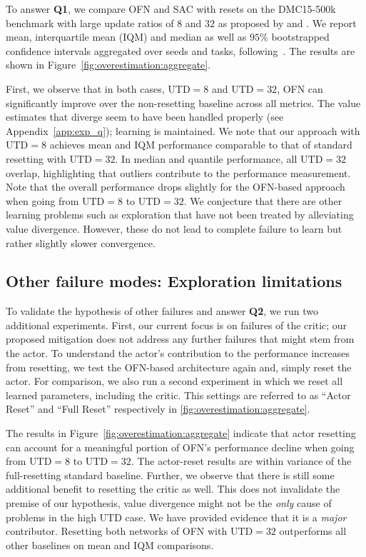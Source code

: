 To answer \textbf{Q1}, we compare OFN and SAC with resets on the DMC15-500k benchmark with large update ratios of $8$ and $32$ as proposed by \textcite{nikishin2022primacy} and  \textcite{schwarzer2023bigger}.  We report mean, interquartile mean (IQM) and median as well as $95\%$ bootstrapped confidence intervals aggregated over seeds and tasks,  following~\textcite{agarwal2021deep}. The results are shown in Figure~\ref{fig:overestimation:aggregate}.

First, we observe that in both cases, $\mathrm{UTD}=8$ and $\mathrm{UTD}=32$, OFN can significantly improve over the non-resetting baseline across all metrics. The value estimates that diverge seem to have been handled properly (see Appendix~\ref{app:exp_q}); learning is maintained. We note that our approach with $\mathrm{UTD}=8$ achieves mean and IQM performance comparable to that of standard resetting with $\mathrm{UTD}=32$. In median and quantile performance, all $\mathrm{UTD}=32$ overlap, highlighting that outliers contribute to the performance measurement. Note that the overall performance drops slightly for the OFN-based approach when going from $\mathrm{UTD}=8$ to $\mathrm{UTD}=32$. We conjecture that there are other learning problems such as exploration that have not been treated by alleviating value divergence. However, these do not lead to complete failure to learn but rather slightly slower convergence. %

\subsection{Other failure modes: Exploration limitations} \label{sec:otherfailure}


To validate the hypothesis of other failures and answer \textbf{Q2}, we run two additional experiments. First, our current focus is on failures of the critic; our proposed mitigation does not address any further failures that might stem from the actor. To understand the actor's contribution to the performance increases from resetting, we test the OFN-based architecture again and, simply reset the actor.
For comparison, we also run a second experiment in which we reset all learned parameters, including the critic.
This settings are referred to as ``Actor Reset'' and ``Full Reset'' respectively in \autoref{fig:overestimation:aggregate}.

The results in Figure~\ref{fig:overestimation:aggregate} indicate that actor resetting can account for a meaningful portion of OFN's performance decline when going from $\mathrm{UTD}=8$ to $\mathrm{UTD}=32$. The actor-reset results are within variance of the full-resetting standard baseline. Further, we observe that there is still some additional benefit to resetting the critic as well. 
This does not invalidate the premise of our hypothesis, value divergence might not be the \emph{only} cause of problems in the high UTD case. We have provided evidence that it is a \emph{major} contributor.
Resetting both networks of OFN with $\mathrm{UTD}=32$  outperforms all other baselines on mean and IQM comparisons. %

